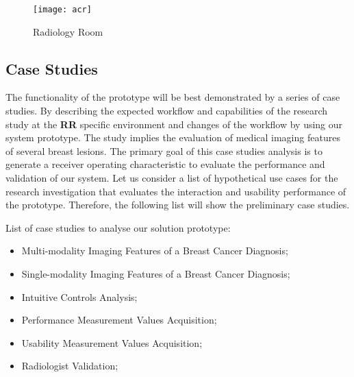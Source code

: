 
\hfill

\begin{figure}[h]
\centering
\texttt{[image: acr]}
\caption{Radiology Room}
\label{fig:radioroom}
\end{figure}

\hfill



\subsection{Case Studies}

The functionality of the prototype will be best demonstrated by a series of case studies. By describing the expected workflow and capabilities of the research study at the \textbf{RR} specific environment and changes of the workflow by using our system prototype. The study implies the evaluation of medical imaging features of several breast lesions. The primary goal of this case studies analysis is to generate a receiver operating characteristic to evaluate the performance and validation of our system. Let us consider a list of hypothetical use cases for the research investigation that evaluates the interaction and usability performance of the prototype. Therefore, the following list will show the preliminary case studies.

\hfill

List of case studies to analyse our solution prototype:

\hfill

\begin{itemize}
\item Multi-modality Imaging Features of a Breast Cancer Diagnosis;
\item Single-modality Imaging Features of a Breast Cancer Diagnosis;
\item Intuitive Controls Analysis;
\item Performance Measurement Values Acquisition;
\item Usability Measurement Values Acquisition;
\item Radiologist Validation;
\end{itemize}

